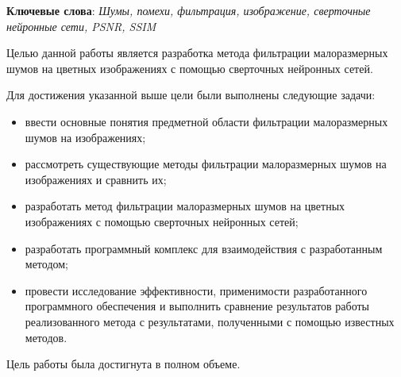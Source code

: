 \begin{essay}{}
    \noindent\textbf{Ключевые слова}: \textit{Шумы, помехи, фильтрация, изображение, сверточные нейронные сети, PSNR, SSIM}
    
Целью данной работы является разработка метода фильтрации малоразмерных шумов на цветных изображениях с помощью сверточных нейронных сетей.

Для достижения указанной выше цели были выполнены следующие задачи:
	\begin{itemize}
		\item ввести основные понятия предметной области фильтрации малоразмерных шумов на изображениях;
		\item рассмотреть существующие методы фильтрации малоразмерных шумов на изображениях и сравнить их;
  	\item разработать метод фильтрации малоразмерных шумов на цветных изображениях с помощью сверточных нейронных сетей;
		\item разработать программный комплекс для взаимодействия с разработанным методом;
        \item провести исследование эффективности, применимости разработанного программного обеспечения и выполнить сравнение результатов работы реализованного метода с результатами, полученными с помощью известных методов.
	\end{itemize}
    
Цель работы была достигнута в полном объеме.
\end{essay}
